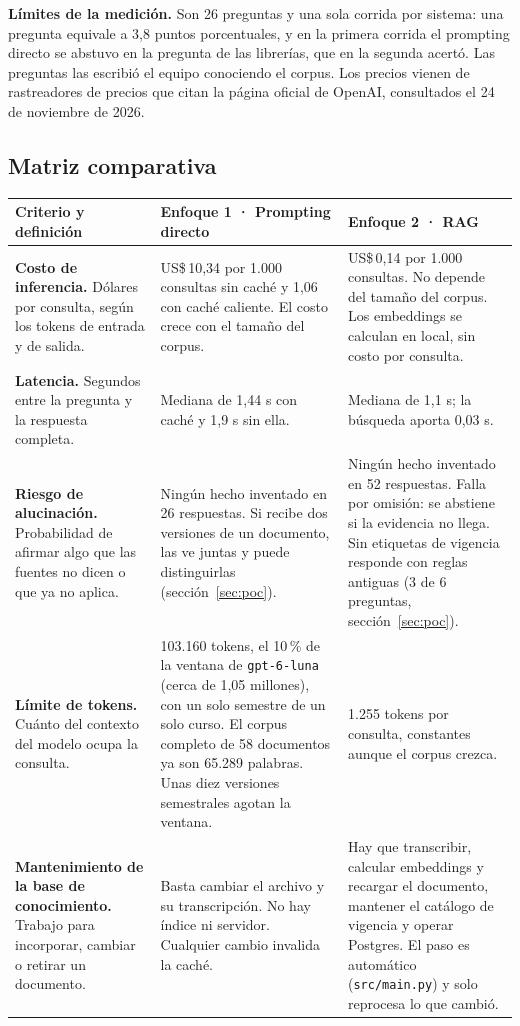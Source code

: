 \documentclass[11pt,letterpaper]{article}
\newcommand{\cod}[1]{\texttt{\small #1}}
\begin{document}
\textbf{Límites de la medición.} Son 26 preguntas y una sola corrida por sistema: una pregunta equivale a 3,8 puntos porcentuales, y en la primera corrida el prompting directo se abstuvo en la pregunta de las librerías, que en la segunda acertó. Las preguntas las escribió el equipo conociendo el corpus. Los precios vienen de rastreadores de precios que citan la página oficial de OpenAI, consultados el 24 de noviembre de 2026.

\subsection{Matriz comparativa}

\begin{table}[H]\footnotesize\renewcommand{\arraystretch}{1.2}
\begin{tabularx}{\textwidth}{>{\raggedright\arraybackslash}p{}LL}
\toprule
\textbf{Criterio y definición} & \textbf{Enfoque 1 · Prompting directo} & \textbf{Enfoque 2 · RAG} \\
\midrule
\textbf{Costo de inferencia.} Dólares por consulta, según los tokens de entrada y de salida. & US\$\,10,34 por 1.000 consultas sin caché y 1,06 con caché caliente. El costo crece con el tamaño del corpus. & US\$\,0,14 por 1.000 consultas. No depende del tamaño del corpus. Los embeddings se calculan en local, sin costo por consulta. \\
\textbf{Latencia.} Segundos entre la pregunta y la respuesta completa. & Mediana de 1,44 s con caché y 1,9 s sin ella. & Mediana de 1,1 s; la búsqueda aporta 0,03 s. \\
\textbf{Riesgo de alucinación.} Probabilidad de afirmar algo que las fuentes no dicen o que ya no aplica. & Ningún hecho inventado en 26 respuestas. Si recibe dos versiones de un documento, las ve juntas y puede distinguirlas (sección~\ref{sec:poc}). & Ningún hecho inventado en 52 respuestas. Falla por omisión: se abstiene si la evidencia no llega. Sin etiquetas de vigencia responde con reglas antiguas (3 de 6 preguntas, sección~\ref{sec:poc}). \\
\textbf{Límite de tokens.} Cuánto del contexto del modelo ocupa la consulta. & 103.160 tokens, el 10\,\% de la ventana de \cod{gpt-6-luna} (cerca de 1,05 millones), con un solo semestre de un solo curso. El corpus completo de 58 documentos ya son 65.289 palabras. Unas diez versiones semestrales agotan la ventana. & 1.255 tokens por consulta, constantes aunque el corpus crezca. \\
\textbf{Mantenimiento de la base de conocimiento.} Trabajo para incorporar, cambiar o retirar un documento. & Basta cambiar el archivo y su transcripción. No hay índice ni servidor. Cualquier cambio invalida la caché. & Hay que transcribir, calcular embeddings y recargar el documento, mantener el catálogo de vigencia y operar Postgres. El paso es automático (\cod{src/main.py}) y solo reprocesa lo que cambió. \\

\end{tabularx}
\end{table}
\end{document}
